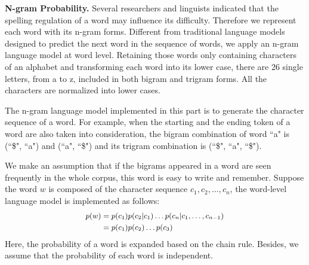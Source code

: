 \textbf{N-gram Probability.} 
Several researchers and linguists indicated that the spelling regulation of a word may influence its difficulty.
Therefore  we represent each word with its n-gram forms.
Different from traditional language models designed to predict the next word in the sequence of words,  we apply an n-gram language model at word level. 
Retaining those words only containing characters of an alphabet and transforming each word into its lower case, there are 26 single letters, from a to z, included in both bigram and trigram forms.
All the characters are normalized into lower cases.

The n-gram language model implemented in this part is to generate the character sequence of a word.
For example, when the starting and the ending token of a word are also taken into consideration, the bigram combination of word ``a" is (``\$", ``a") and (``a", ``\$") and its trigram combination is (``\$", ``a", ``\$"). 

We make an assumption that if the bigrams appeared in a word are seen frequently in the whole corpus, this word is easy to write and remember.
Suppose the word $w$ is composed of the character sequence $c_1, c_2, \dots, c_n$, the word-level language model is implemented as follows:
\begin{equation}
\small
\label{equ:proba}
\begin{split}
p(w)&=p(c_1) p(c_2|c_1)\dots p(c_n|c_1,\dots,c_{n-1})\\
&=p(c_1) p(c_2) \dots  p(c_3)
\end{split}
\end{equation}
Here, the probability of a word is expanded based on the chain rule. Besides, we assume that the probability of each word is independent.




